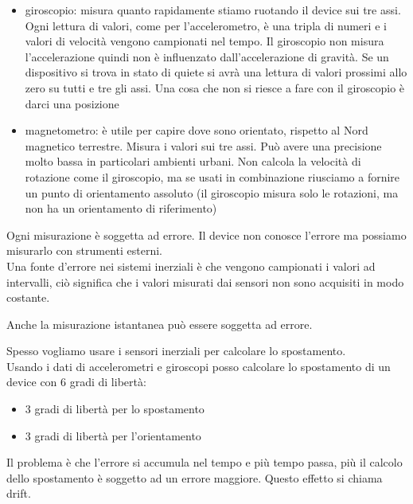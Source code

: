 \begin{itemize}
    \item giroscopio: misura quanto rapidamente stiamo ruotando il device sui tre assi. Ogni lettura di valori, come per l'accelerometro, è una tripla di numeri e i valori di velocità vengono campionati nel tempo. Il giroscopio non misura l'accelerazione quindi non è influenzato dall'accelerazione di gravità. Se un dispositivo si trova in stato di quiete si avrà una lettura di valori prossimi allo zero su tutti e tre gli assi. Una cosa che non si riesce a fare con il giroscopio è darci una posizione
    \item magnetometro: è utile per capire dove sono orientato, rispetto al Nord magnetico terrestre. Misura i valori sui tre assi. Può avere una precisione molto bassa in particolari ambienti urbani. Non calcola la velocità di rotazione come il giroscopio, ma se usati in combinazione riusciamo a fornire un punto di orientamento assoluto (il giroscopio misura solo le rotazioni, ma non ha un orientamento di riferimento)
\end{itemize}

Ogni misurazione è soggetta ad errore. Il device non conosce l'errore ma possiamo misurarlo con strumenti esterni. 
\\ Una fonte d'errore nei sistemi inerziali è che vengono campionati i valori ad intervalli, ciò significa che i valori misurati dai sensori non sono acquisiti in modo costante. 

Anche la misurazione istantanea può essere soggetta ad errore. 

Spesso vogliamo usare i sensori inerziali per calcolare lo spostamento. 
\\ Usando i dati di accelerometri e giroscopi posso calcolare lo spostamento di un device con 6 gradi di libertà: 
\begin{itemize}
    \item 3 gradi di libertà per lo spostamento
    \item 3 gradi di libertà per l'orientamento
\end{itemize}
Il problema è che l'errore si accumula nel tempo e più tempo passa, più il calcolo dello spostamento è soggetto ad un errore maggiore. Questo effetto si chiama drift.

